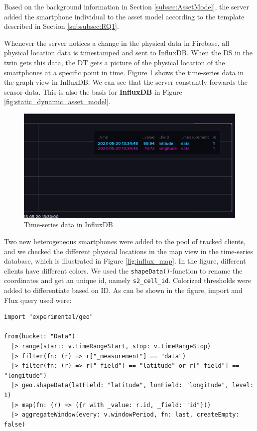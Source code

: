 \documentclass{article}
\begin{document}
Based on the background information in Section \ref{subsec:AssetModel}, the server added the smartphone individual to the asset model according to the template described in Section \ref{subsubsec:RQ1}.

Whenever the server notices a change in the physical data in Firebase, all physical location data is timestamped and sent to InfluxDB. When the DS in the twin gets this data, the DT gets a picture of the physical location of the smartphones at a specific point in time. Figure \ref{fig:influx} shows the time-series data in the graph view in InfluxDB. We can see that the server constantly forwards the sensor data. This is also the basis for \textbf{InfluxDB} in Figure \ref{fig:static_dynamic_asset_model}.

\begin{figure}[H]
    \centering
    \includegraphics[scale=0.30]{graphics/influx.png}
    \caption{Time-series data in InfluxDB}
    \label{fig:influx}
\end{figure}

Two new heterogeneous smartphones were added to the pool of tracked clients, and we checked the different physical locations in the map view in the time-series database, which is illustrated in Figure \ref{fig:influx_map}. In the figure, different clients have different colors. We used the \verb|shapeData()|-function to rename the coordinates and get an unique id, namely \verb|s2_cell_id|. Colorized thresholds were added to differentiate based on ID. As can be shown in the figure, import and Flux query used were:
\begin{small}
\begin{Verbatim}
import "experimental/geo"

from(bucket: "Data")
  |> range(start: v.timeRangeStart, stop: v.timeRangeStop)
  |> filter(fn: (r) => r["_measurement"] == "data")
  |> filter(fn: (r) => r["_field"] == "latitude" or r["_field"] == "longitude")
  |> geo.shapeData(latField: "latitude", lonField: "longitude", level: 1)
  |> map(fn: (r) => ({r with _value: r.id, _field: "id"}))
  |> aggregateWindow(every: v.windowPeriod, fn: last, createEmpty: false)
\end{Verbatim}
\end{small}
\end{document}
